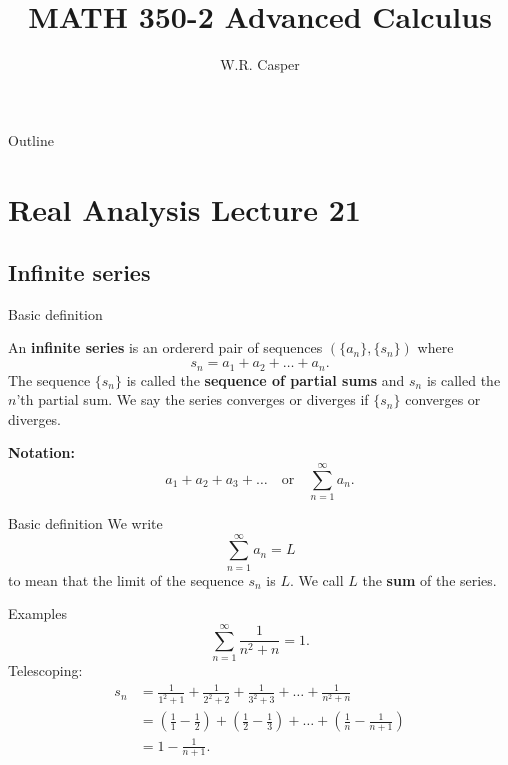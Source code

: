 \documentclass{beamer}
\title{MATH 350-2 Advanced Calculus}
\subtitle
{} %
\author[W.R. Casper] %
{W.R. Casper}
\institute[California State University Fullerton] %
{
  Department of Mathematics\\
  California State University Fullerton}
\begin{document}
\begin{frame}
  \titlepage
\end{frame}

\begin{frame}{Outline}
  \tableofcontents
\end{frame}



\section{Real Analysis Lecture 21}

\subsection{Infinite series}

\begin{frame}{Basic definition}
\begin{defn}
An \textbf{infinite series} is an ordererd pair of sequences $(\{a_n\},\{s_n\})$ where 
$$s_n = a_1+a_2+\dots+a_n.$$
The sequence $\{s_n\}$ is called the \textbf{sequence of partial sums} and $s_n$ is called the $n$'th partial sum.
We say the series converges or diverges if $\{s_n\}$ converges or diverges.
\end{defn}
\textbf{Notation:}
$$a_1+a_2+a_3+\dots\quad\text{or}\quad \sum_{n=1}^\infty a_n.$$
\end{frame}

\begin{frame}{Basic definition}
We write
$$\sum_{n=1}^\infty a_n = L$$
to mean that the limit of the sequence $s_n$ is $L$.
We call $L$ the \textbf{sum} of the series.
\end{frame}

\begin{frame}{Examples}
$$\sum_{n=1}^\infty \frac{1}{n^2+n} = 1.$$
\pause
Telescoping:
\pause
\begin{align*}
s_n &= \frac{1}{1^2+1} + \frac{1}{2^2+2} +  \frac{1}{3^2+3} + \dots + \frac{1}{n^2+n}\\
    &= \left(\frac{1}{1}-\frac{1}{2}\right) + \left(\frac{1}{2}-\frac{1}{3}\right) +\dots+ \left(\frac{1}{n}-\frac{1}{n+1}\right)\\
    &= 1-\frac{1}{n+1}.
\end{align*}
\end{frame}
\end{document}
